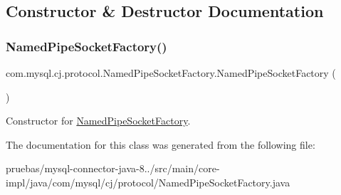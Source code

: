 \subsection{Constructor \& Destructor Documentation}
\mbox{\label{classcom_1_1mysql_1_1cj_1_1protocol_1_1_named_pipe_socket_factory_a171ec7b6055445fc5e8abda2ebaa5b63}} 
\subsubsection{\texorpdfstring{Named\+Pipe\+Socket\+Factory()}{NamedPipeSocketFactory()}}
{\footnotesize\ttfamily com.\+mysql.\+cj.\+protocol.\+Named\+Pipe\+Socket\+Factory.\+Named\+Pipe\+Socket\+Factory (\begin{DoxyParamCaption}{ }\end{DoxyParamCaption})}

Constructor for \mbox{\hyperlink{classcom_1_1mysql_1_1cj_1_1protocol_1_1_named_pipe_socket_factory}{Named\+Pipe\+Socket\+Factory}}. 

The documentation for this class was generated from the following file\+:\begin{DoxyCompactItemize}
\item 
pruebas/mysql-\/connector-\/java-\/8../src/main/core-\/impl/java/com/mysql/cj/protocol/Named\+Pipe\+Socket\+Factory.\+java\end{DoxyCompactItemize}
